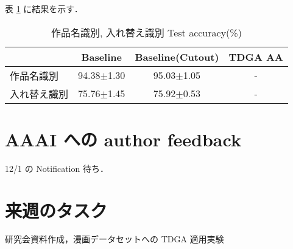 \documentclass[onecolumn]{ujarticle}   %
\begin{document}
  表 \ref{tab:result_experiments} に結果を示す．
  \begin{table}[h]
		\centering
		\caption{作品名識別, 入れ替え識別 Test accuracy(\%)}
		\label{tab:result_experiments}
		\begin{tabular}{l||c c c} \hline
		  &Baseline&Baseline(Cutout)&TDGA AA\\ \hline
      作品名識別&94.38$\pm$1.30 &95.03$\pm$1.05&-\\
      入れ替え識別&75.76$\pm$1.45 &75.92$\pm$0.53&-\\
		\end{tabular}
	\end{table}

  \section{AAAI への author feedback}
  12/1 の Notification 待ち．


  \section{来週のタスク}
  研究会資料作成，漫画データセットへの TDGA 適用実験

\end{document}
